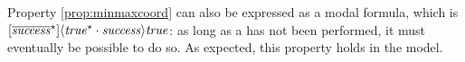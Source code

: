 Property \ref{prop:minmaxcoord} can also be expressed as a modal formula, which is $[{\overline{\it success}}^{\star} ] \langle {\it true}^{\star} \cdot {\it success} \rangle {\it true}$: as long as a  has not been performed, it must eventually be possible to do so. As expected, this property holds in the model.
